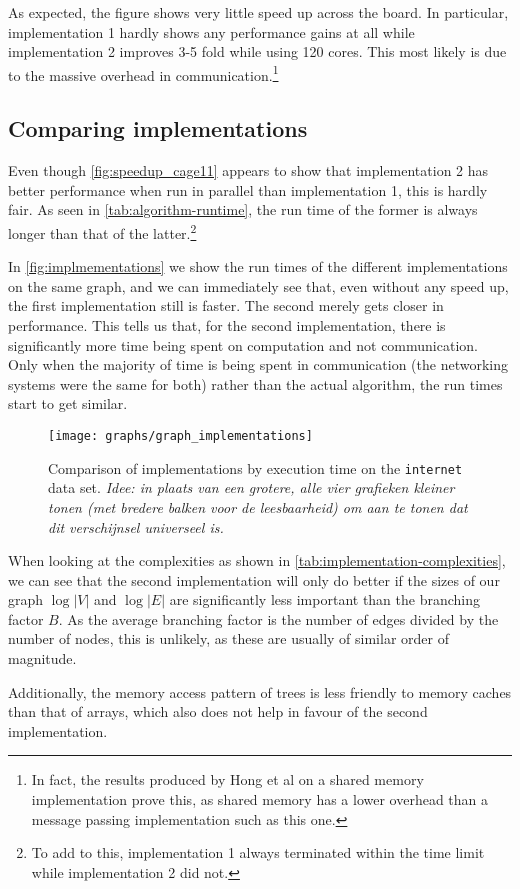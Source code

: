 As expected, the figure shows very little speed up across the board. In particular, implementation 1 hardly shows any performance gains at all while implementation 2 improves 3-5 fold while using 120 cores. This most likely is due to the massive overhead in communication.\footnote{In fact, the results produced by Hong et al \cite{LockFreeMultithreadedMaxFlow} on a shared memory implementation prove this, as shared memory has a lower overhead than a message passing implementation such as this one.}

\subsection{Comparing implementations}
Even though \autoref{fig:speedup_cage11} appears to show that implementation 2 has better performance when run in parallel than implementation 1, this is hardly fair. As seen in \autoref{tab:algorithm-runtime}, the run time of the former is always longer than that of the latter.\footnote{To add to this, implementation 1 always terminated within the time limit while implementation 2 did not.}

In \autoref{fig:implmementations} we show the run times of the different implementations on the same graph, and we can immediately see that, even without any speed up, the first implementation still is faster. The second merely gets closer in performance. This tells us that, for the second implementation, there is significantly more time being spent on computation and not communication. Only when the majority of time is being spent in communication (the networking systems were the same for both) rather than the actual algorithm, the run times start to get similar.

\begin{figure}[b!]
	\centering
  \texttt{[image: graphs/graph\_implementations]}
  \caption{Comparison of implementations by execution time on the \texttt{internet} data set. \emph{Idee: in plaats van een grotere, alle vier grafieken kleiner tonen (met bredere balken voor de leesbaarheid) om aan te tonen dat dit verschijnsel universeel is.}}
  \label{fig:implmementations}
\end{figure}

When looking at the complexities as shown in \autoref{tab:implementation-complexities}, we can see that the second implementation will only do better if the sizes of our graph $\log |V|$ and $\log |E|$ are significantly less important than the branching factor $B$. As the average branching factor is the number of edges divided by the number of nodes, this is unlikely, as these are usually of similar order of magnitude.

Additionally, the memory access pattern of trees is less friendly to memory caches than that of arrays, which also does not help in favour of the second implementation.
